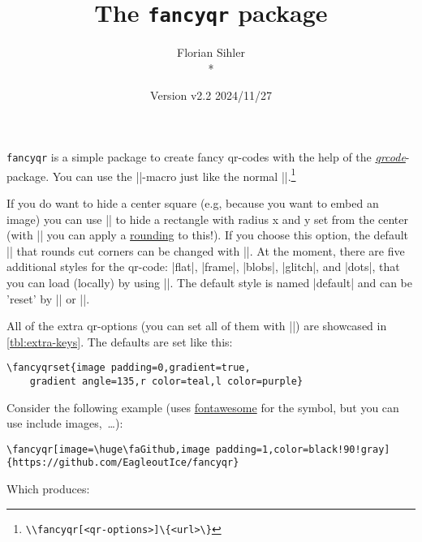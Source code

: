 \documentclass[parskip=half,english,numbers=noenddot,footnotes=nomultiple,oneside]{scrartcl}
\title{The \texttt{fancyqr} package}
\author{%
	\texorpdfstring{Florian Sihler\medskip\\*
		\fancyqr{https://github.com/EagleoutIce/fancyqr}
	}{Florian Sihler}}
\date{Version v2.2 \textendash{} 2024/11/27}
\def\ltx#1{\lstinline/#1/}
\begin{document}
   \maketitle


	\texttt{fancyqr} is a simple package to create fancy qr-codes with the help of the \textit{\href{https://www.ctan.org/pkg/qrcode}{qrcode}}-package.
	You can use the |\fancyqr|-macro just like the normal |\qrcode|.\footnote{\ltx{\\fancyqr[<qr-options>]\{<url>\}}}

	If you do want to hide a center square (e.g, because you want to embed an image) you can use || to hide a rectangle with radius x and y set from the center (with || you can apply a \href{https://github.com/EagleoutIce/fancyqr/pull/41}{rounding} to this!). If you choose this option, the default |\FancyQrRoundCut| that rounds cut corners can be changed with |\FancyQrHardCut|.
	At the moment, there are five additional styles for the qr-code: |flat|, |frame|, |blobs|, |glitch|, and |dots|, that you can load (locally) by using ||. The default style is named |default| and can be 'reset' by || or |\FancyQrLoadDefault|.

	All of the extra qr-options (you can set all of them with ||) are showcased in \autoref{tbl:extra-keys}.
	The defaults are set like this:
\begin{lstlisting}
\fancyqrset{image padding=0,gradient=true,
	gradient angle=135,r color=teal,l color=purple}
\end{lstlisting}
	Consider the following example (uses \href{https://www.ctan.org/pkg/fontawesome}{fontawesome} for the symbol, but you can use include images,~\ldots):
\begin{lstlisting}
\fancyqr[image=\huge\faGithub,image padding=1,color=black!90!gray]{https://github.com/EagleoutIce/fancyqr}
\end{lstlisting}

	\parbox[c]{.3\linewidth}{Which produces:}\hfill\parbox[c]{.4\linewidth}{\raggedleft{}}\par
\end{document}
